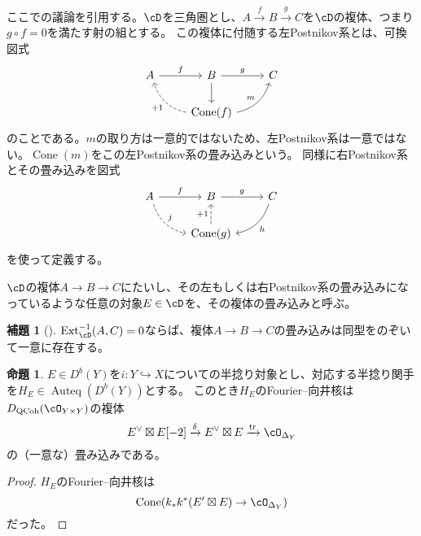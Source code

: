 \documentclass[uplatex, a4paper, dvipdfmx]{jsarticle}
\theoremstyle{definition}
\newtheorem{proposition}[theorem]{命題}
\newtheorem{lemma}[theorem]{補題}
\DeclareMathOperator{\Auteq}{\mathrm{Auteq}}
\DeclareMathOperator{\Cone}{\mathrm{Cone}}
\DeclareMathOperator{\Ext}{\mathrm{Ext}}
\DeclareMathOperator{\QCoh}{\mathrm{QCoh}}
\DeclareMathOperator{\tr}{\mathrm{tr}}
\begin{document}
ここで{\cite{MR4452435}}の議論を引用する。$\cD$を三角圏とし、$A \xrightarrow{f} B \xrightarrow{g} C$を$\cD$の複体、つまり$g \circ f=0$を満たす射の組とする。
この複体に付随する左Postnikov系とは、可換図式
\[
    \begin{tikzcd}
        A \ar[r, "f"] & B \ar[r, "g"]\ar[d] & C \\
        & \Cone(f)\ar[lu, dashed, bend left, "+1"] \ar[ru, bend right, "m"] &
    \end{tikzcd}
\]
のことである。$m$の取り方は一意的ではないため、左Postnikov系は一意ではない。$\Cone(m)$をこの左Postnikov系の畳み込みという。
同様に右Postnikov系とその畳み込みを図式
\[
    \begin{tikzcd}
        A \ar[r, "f"] \ar[rd, bend right, dashed, "j"]& B \ar[r, "g"] & C \ar[ld, bend left, "h"] \\
        & \Cone(g)\ar[u, dashed, "+1"] &
    \end{tikzcd}
\]
を使って定義する。

$\cD$の複体$A \to B \to C$にたいし、その左もしくは右Postnikov系の畳み込みになっているような任意の対象$E \in \cD$を、その複体の畳み込みと呼ぶ。
\begin{lemma}[{\cite{MR4452435}}]
    $\Ext^{-1}_{\cD}(A, C) = 0$ならば、複体$A \to B \to C$の畳み込みは同型をのぞいて一意に存在する。
\end{lemma}


\begin{proposition}
    $E \in D^b(Y)$を$i \colon Y \hookrightarrow X$についての半捻り対象とし、対応する半捻り関手を$H_E \in \Auteq(D^b(Y))$とする。
    このとき$H_E$のFourier--向井核は$D_{\QCoh}(\cO_{Y \times Y})$の複体
    \begin{equation}
        E^\vee \boxtimes E[-2] \xrightarrow{\delta} E^\vee \boxtimes E \xrightarrow{\tr} \cO_{\Delta_Y}
    \end{equation}
    の（一意な）畳み込みである。
\end{proposition}
\begin{proof}
    $H_E$のFourier--向井核は
    \begin{equation}
        \Cone(k_*k^*(E' \boxtimes E) \to \cO_{\Delta_Y})
    \end{equation}
    だった。
\end{proof}
\end{document}
